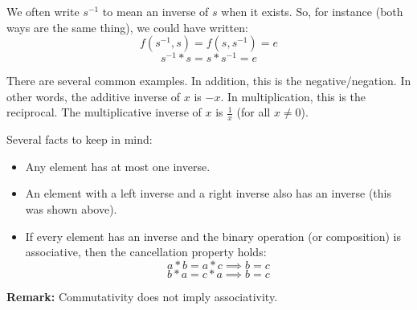 \documentclass[letterpaper]{article}
\begin{document}
\begin{itemize}
    \bigskip 

    We often write $s^{-1}$ to mean an inverse of $s$ when it exists. So, for instance (both ways are the same thing), we could have written: 
    \[f(s^{-1}, s) = f(s, s^{-1}) = e\]
    \[s^{-1} * s = s * s^{-1} = e\]

    \bigskip 

    There are several common examples. In addition, this is the negative/negation. In other words, the additive inverse of $x$ is $-x$. In multiplication, this is the reciprocal. The multiplicative inverse of $x$ is $\frac{1}{x}$ (for all $x \neq 0$). 
    
    \bigskip 
    
    Several facts to keep in mind: 
    \begin{itemize}
        \item Any element has at most one inverse. 
        \item An element with a left inverse and a right inverse also has an inverse (this was shown above). 
        \item If every element has an inverse and the binary operation (or composition) is associative, then the cancellation property holds: 
        \[a * b = a * c \implies b = c\]
        \[b * a = c * a \implies b = c\]
    \end{itemize}
\end{itemize}

\textbf{Remark:} Commutativity does not imply associativity.
\end{document}
